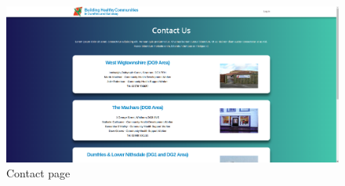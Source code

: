 \documentclass{bhcguides}
\begin{document}
\begin{figure}[h]
 \centerline{\includegraphics[width=\textwidth, height=\textheight, keepaspectratio]{contactpage.png}}
 \caption{Contact page}
 \label{fig:contactPage}
\end{figure}
\end{document}
